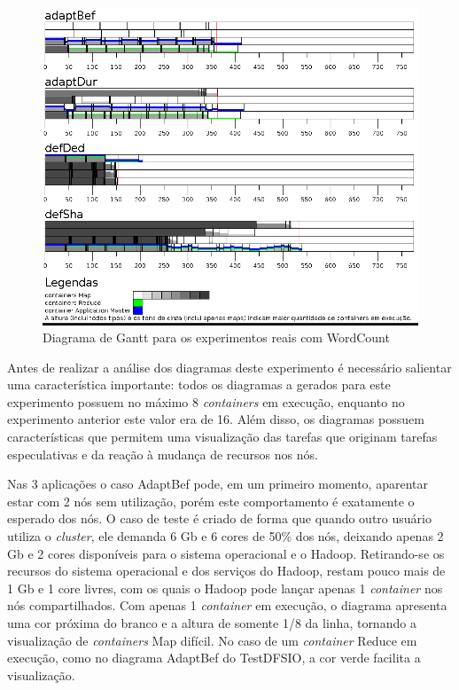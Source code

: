\begin{figure}[!ht]
	\centering
	\includegraphics[width=\textwidth]{figuras/WC-real.png}
	\caption{Diagrama de Gantt para os experimentos reais com WordCount}
	\label{fig:exp2WC}
\end{figure}



Antes de realizar a análise dos diagramas deste experimento é necessário salientar uma característica importante: todos os diagramas a gerados para este experimento possuem no máximo 8 \textit{containers} em execução, enquanto no experimento anterior este valor era de 16. Além disso, os diagramas possuem características que permitem uma visualização das tarefas que originam tarefas especulativas e da reação à mudança de recursos nos nós. 

Nas 3 aplicações o caso AdaptBef pode, em um primeiro momento, aparentar estar com 2 nós sem utilização, porém este comportamento é exatamente o esperado dos nós. O caso de teste é criado de forma que quando outro usuário utiliza o \textit{cluster}, ele demanda 6 Gb e 6 cores de 50\% dos nós, deixando apenas 2 Gb e 2 cores disponíveis para o sistema operacional e o Hadoop. Retirando-se os recursos do sistema operacional e dos serviços do Hadoop, restam pouco mais de 1 Gb e 1 core livres, com os quais o Hadoop pode lançar apenas 1 \textit{container} nos nós compartilhados. Com apenas 1 \textit{container} em execução, o diagrama apresenta uma cor próxima do branco e a altura de somente 1/8 da linha, tornando a visualização de \textit{containers} Map difícil. No caso de um \textit{container} Reduce em execução, como no diagrama AdaptBef do TestDFSIO, a cor verde facilita a visualização.

